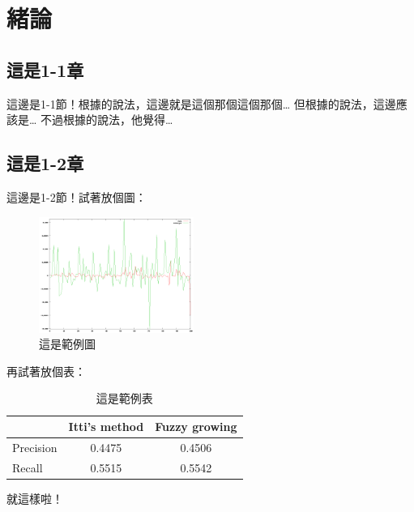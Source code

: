 \chapter{緒論}
\label{c:intro}
\section{這是1-1章}
這邊是1-1節！根據\cite{Borenstein:1991:VFH}的說法，這邊就是這個那個這個那個…
但根據\cite{Ulrich:1998:VFHPlus}的說法，這邊應該是…
不過根據\cite{Siegwart:2004:IAMR}的說法，他覺得…

\newpage
\section{這是1-2章}
這邊是1-2節！試著放個圖：
\begin{figure}[h!]
\centering
\includegraphics[width=0.45\textwidth]{sample}
\caption{這是範例圖}
\label{kl}
\end{figure}

再試著放個表：
\begin{table}[h!]
\begin{center}
\begin{tabular}{lcc}

\hline
                    &  {\small Itti's method}     & {\small Fuzzy growing}    \\
\hline
{\small Precision}           &  0.4475    & 0.4506 \\
{\small Recall}              &  0.5515    & 0.5542 \\
\hline

\end{tabular}
\caption{這是範例表}
\label{t:FOA}
\end{center}
\end{table}

就這樣啦！
